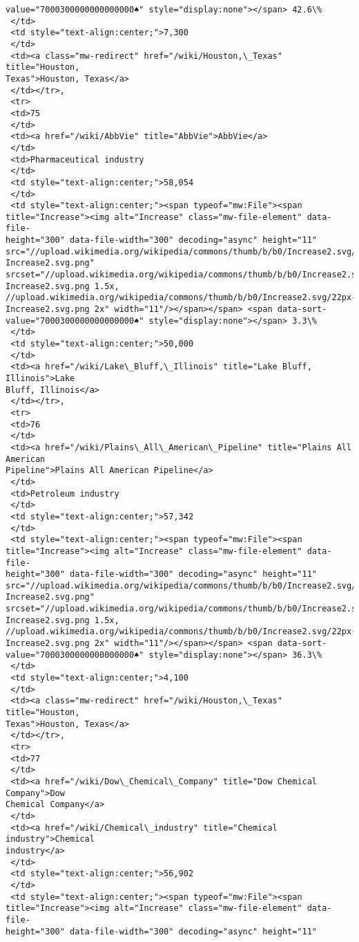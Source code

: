\documentclass[11pt]{article}
\begin{document}
\begin{tcolorbox}[breakable, size=fbox, boxrule=.5pt, pad at break*=1mm, opacityfill=0]
\begin{Verbatim}[commandchars=\\\{\}]
value="7000300000000000000♠" style="display:none"></span> 42.6\%
 </td>
 <td style="text-align:center;">7,300
 </td>
 <td><a class="mw-redirect" href="/wiki/Houston,\_Texas" title="Houston,
Texas">Houston, Texas</a>
 </td></tr>,
 <tr>
 <td>75
 </td>
 <td><a href="/wiki/AbbVie" title="AbbVie">AbbVie</a>
 </td>
 <td>Pharmaceutical industry
 </td>
 <td style="text-align:center;">58,054
 </td>
 <td style="text-align:center;"><span typeof="mw:File"><span
title="Increase"><img alt="Increase" class="mw-file-element" data-file-
height="300" data-file-width="300" decoding="async" height="11"
src="//upload.wikimedia.org/wikipedia/commons/thumb/b/b0/Increase2.svg/11px-
Increase2.svg.png"
srcset="//upload.wikimedia.org/wikipedia/commons/thumb/b/b0/Increase2.svg/17px-
Increase2.svg.png 1.5x,
//upload.wikimedia.org/wikipedia/commons/thumb/b/b0/Increase2.svg/22px-
Increase2.svg.png 2x" width="11"/></span></span> <span data-sort-
value="7000300000000000000♠" style="display:none"></span> 3.3\%
 </td>
 <td style="text-align:center;">50,000
 </td>
 <td><a href="/wiki/Lake\_Bluff,\_Illinois" title="Lake Bluff, Illinois">Lake
Bluff, Illinois</a>
 </td></tr>,
 <tr>
 <td>76
 </td>
 <td><a href="/wiki/Plains\_All\_American\_Pipeline" title="Plains All American
Pipeline">Plains All American Pipeline</a>
 </td>
 <td>Petroleum industry
 </td>
 <td style="text-align:center;">57,342
 </td>
 <td style="text-align:center;"><span typeof="mw:File"><span
title="Increase"><img alt="Increase" class="mw-file-element" data-file-
height="300" data-file-width="300" decoding="async" height="11"
src="//upload.wikimedia.org/wikipedia/commons/thumb/b/b0/Increase2.svg/11px-
Increase2.svg.png"
srcset="//upload.wikimedia.org/wikipedia/commons/thumb/b/b0/Increase2.svg/17px-
Increase2.svg.png 1.5x,
//upload.wikimedia.org/wikipedia/commons/thumb/b/b0/Increase2.svg/22px-
Increase2.svg.png 2x" width="11"/></span></span> <span data-sort-
value="7000300000000000000♠" style="display:none"></span> 36.3\%
 </td>
 <td style="text-align:center;">4,100
 </td>
 <td><a class="mw-redirect" href="/wiki/Houston,\_Texas" title="Houston,
Texas">Houston, Texas</a>
 </td></tr>,
 <tr>
 <td>77
 </td>
 <td><a href="/wiki/Dow\_Chemical\_Company" title="Dow Chemical Company">Dow
Chemical Company</a>
 </td>
 <td><a href="/wiki/Chemical\_industry" title="Chemical industry">Chemical
industry</a>
 </td>
 <td style="text-align:center;">56,902
 </td>
 <td style="text-align:center;"><span typeof="mw:File"><span
title="Increase"><img alt="Increase" class="mw-file-element" data-file-
height="300" data-file-width="300" decoding="async" height="11"

\end{Verbatim}
\end{tcolorbox}
\end{document}
